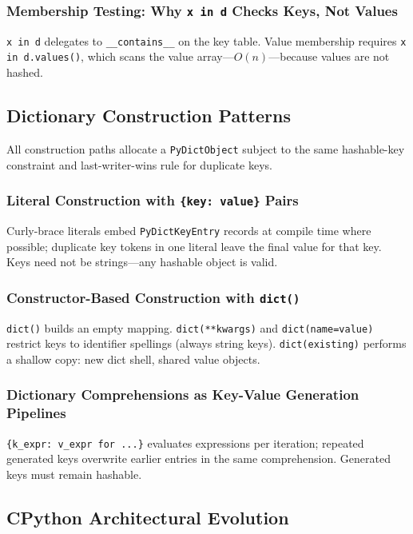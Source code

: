 \documentclass[a4paper,twoside]{report}
\begin{document}
\subsubsection{Membership Testing: Why \texttt{x in d} Checks Keys, Not Values}

\texttt{x in d} delegates to \texttt{\_\_contains\_\_} on the key table. Value membership requires \texttt{x in d.values()}, which scans the value array---$O(n)$---because values are not hashed.


\subsection{Dictionary Construction Patterns}

All construction paths allocate a \texttt{PyDictObject} subject to the same hashable-key constraint and last-writer-wins rule for duplicate keys.

\subsubsection{Literal Construction with \texttt{\{key: value\}} Pairs}

Curly-brace literals embed \texttt{PyDictKeyEntry} records at compile time where possible; duplicate key tokens in one literal leave the final value for that key. Keys need not be strings---any hashable object is valid.

\subsubsection{Constructor-Based Construction with \texttt{dict()}}

\texttt{dict()} builds an empty mapping. \texttt{dict(**kwargs)} and \texttt{dict(name=value)} restrict keys to identifier spellings (always string keys). \texttt{dict(existing)} performs a shallow copy: new dict shell, shared value objects.

\subsubsection{Dictionary Comprehensions as Key-Value Generation Pipelines}

\texttt{\{k\_expr: v\_expr for ...\}} evaluates expressions per iteration; repeated generated keys overwrite earlier entries in the same comprehension. Generated keys must remain hashable.


\subsection{CPython Architectural Evolution}
\end{document}
